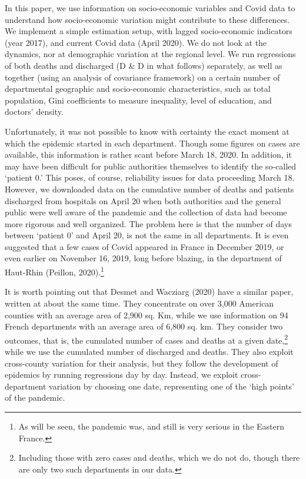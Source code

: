 \documentclass[a4paper]{article}
\theoremstyle{plain}
\theoremstyle{definition}
\begin{document}
In this paper, we use information on socio-economic variables and Covid data to understand how socio-economic variation might contribute to these differences. We implement a simple estimation setup, with lagged socio-economic indicators (year 2017), and current Covid data (April 2020). We do not look at the dynamics, nor at demographic variation at the regional level. We run regressions of both deaths and discharged (D \& D in what follows) separately, as well as together (using an analysis of covariance framework) on a certain number of departmental geographic and  socio-economic characteristics, such as total population, Gini coefficients to measure inequality, level of education, and doctors' density.  

Unfortunately, it was not possible to know with certainty the exact moment at which the epidemic started in each department. Though some figures on cases are available, this information is rather scant before March 18, 2020. In addition, it may have been difficult for public authorities themselves to identify the so-called `patient 0.' This poses, of course, reliability issues for data proceeding March 18. However, we downloaded data on the cumulative number of deaths and patients discharged from hospitals on April 20 when both authorities and the general public were well aware of the pandemic and the collection of data had become more rigorous and well organized. The problem here is that the number of days between `patient 0' and April 20, is not the same in all departments. It is even suggested that a few cases of Covid appeared in France  in December 2019, or even earlier on November 16, 2019, long before blazing, in the department of Haut-Rhin (Peillon, 2020).\footnote{As will be seen, the pandemic was, and still is very serious in the Eastern France.}

It is worth pointing out that Desmet and Wacziarg (2020) have a similar paper, written at about the same time. They concentrate on over 3,000 American counties with an average area of 2,900 sq. Km, while we use information on 94 French departments with an average area of 6,800 sq. km. They consider two outcomes, that is, the cumulated number of cases and deaths at a given date,\footnote {Including those with zero cases and deaths, which we do not do, though there are only two such departments in our data.} while we use the cumulated number of discharged and deaths. They also exploit cross-county variation for their analysis, but they follow the development of epidemics by running regressions day by day. Instead, we exploit cross-department variation by choosing one date, representing one of the \lq high points' of the pandemic. 
\end{document}
